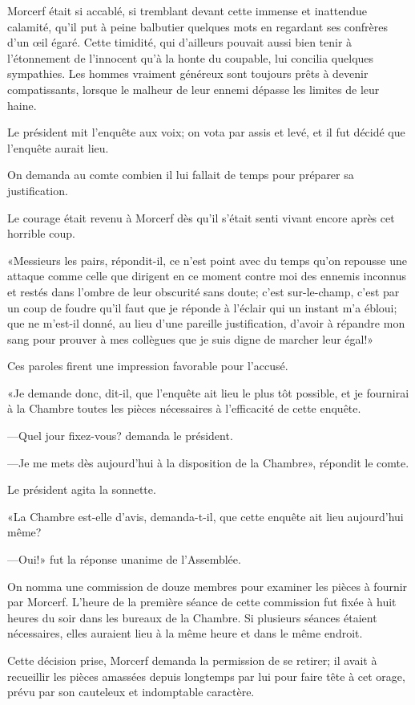 Morcerf était si accablé, si tremblant devant cette immense et inattendue calamité, qu'il put à peine balbutier quelques mots en regardant ses confrères d'un œil égaré. Cette timidité, qui d'ailleurs pouvait aussi bien tenir à l'étonnement de l'innocent qu'à la honte du coupable, lui concilia quelques sympathies. Les hommes vraiment généreux sont toujours prêts à devenir compatissants, lorsque le malheur de leur ennemi dépasse les limites de leur haine. 

Le président mit l'enquête aux voix; on vota par assis et levé, et il fut décidé que l'enquête aurait lieu. 

On demanda au comte combien il lui fallait de temps pour préparer sa justification. 

Le courage était revenu à Morcerf dès qu'il s'était senti vivant encore après cet horrible coup. 

«Messieurs les pairs, répondit-il, ce n'est point avec du temps qu'on repousse une attaque comme celle que dirigent en ce moment contre moi des ennemis inconnus et restés dans l'ombre de leur obscurité sans doute; c'est sur-le-champ, c'est par un coup de foudre qu'il faut que je réponde à l'éclair qui un instant m'a ébloui; que ne m'est-il donné, au lieu d'une pareille justification, d'avoir à répandre mon sang pour prouver à mes collègues que je suis digne de marcher leur égal!» 

Ces paroles firent une impression favorable pour l'accusé. 

«Je demande donc, dit-il, que l'enquête ait lieu le plus tôt possible, et je fournirai à la Chambre toutes les pièces nécessaires à l'efficacité de cette enquête. 

—Quel jour fixez-vous? demanda le président. 

—Je me mets dès aujourd'hui à la disposition de la Chambre», répondit le comte. 

Le président agita la sonnette. 

«La Chambre est-elle d'avis, demanda-t-il, que cette enquête ait lieu aujourd'hui même? 

—Oui!» fut la réponse unanime de l'Assemblée. 

On nomma une commission de douze membres pour examiner les pièces à fournir par Morcerf. L'heure de la première séance de cette commission fut fixée à huit heures du soir dans les bureaux de la Chambre. Si plusieurs séances étaient nécessaires, elles auraient lieu à la même heure et dans le même endroit. 

Cette décision prise, Morcerf demanda la permission de se retirer; il avait à recueillir les pièces amassées depuis longtemps par lui pour faire tête à cet orage, prévu par son cauteleux et indomptable caractère. 


